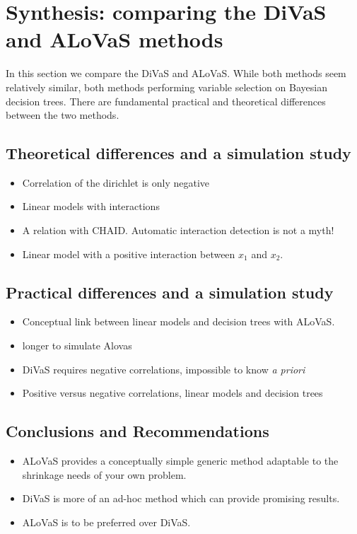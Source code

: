 \section{Synthesis: comparing the DiVaS and ALoVaS methods}
In this section we compare the DiVaS and ALoVaS. While both methods seem relatively similar, both methods performing variable selection on Bayesian decision trees. There are fundamental practical and theoretical differences between the two methods. 

\subsection{Theoretical differences and a simulation study}

\begin{itemize}
\item Correlation of the dirichlet is only negative  
\item Linear models with interactions  
\item A relation with CHAID. Automatic interaction detection is not a myth! 
\item Linear model with a positive interaction between $x_1$ and $x_2$. 
\end{itemize}

\subsection{Practical differences and a simulation study}

\begin{itemize}
\item Conceptual link between linear models  and decision trees with ALoVaS. 
\item longer to simulate Alovas 
\item DiVaS requires negative correlations, impossible to know \emph{a priori}
\item Positive versus negative correlations, linear models and decision trees
\end{itemize}

\subsection{Conclusions and Recommendations}

\begin{itemize}
\item ALoVaS provides a conceptually simple generic method adaptable to the shrinkage needs of your own problem. 
\item DiVaS is more of an ad-hoc method which can provide promising results. 
\item ALoVaS is to be preferred over DiVaS. 
\end{itemize}

